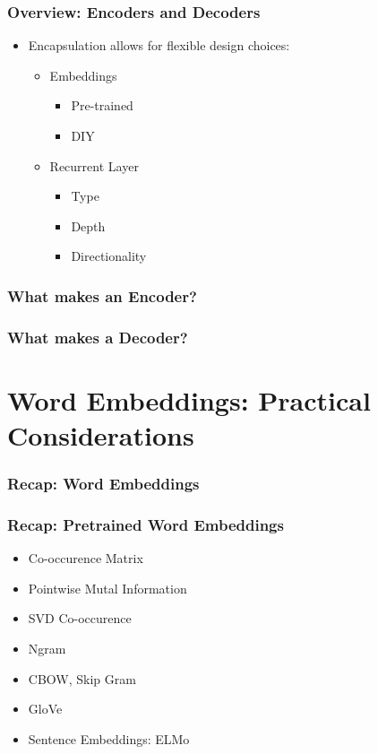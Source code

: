 \documentclass{beamer}
\begin{document}
\begin{frame}
\frametitle{Overview: Encoders and Decoders}
\begin{itemize}
  \item Encapsulation allows for flexible design choices:
  \begin{itemize}
    \item Embeddings
    \begin{itemize}
      \item Pre-trained
      \item DIY
    \end{itemize}
    \item Recurrent Layer
    \begin{itemize}
      \item Type
      \item Depth
      \item Directionality
    \end{itemize}
  \end{itemize}
\end{itemize}
\end{frame}

\begin{frame}
\frametitle{What makes an Encoder?}

\end{frame}

\begin{frame}
\frametitle{What makes a Decoder?}

\end{frame}


\section{Word Embeddings: Practical Considerations}

\begin{frame}
\frametitle{Recap: Word Embeddings}

\end{frame}


\begin{frame}
\frametitle{Recap: Pretrained Word Embeddings}
\begin{itemize}
  \item Co-occurence Matrix
  \item Pointwise Mutal Information
  \item SVD Co-occurence
  \item Ngram
  \item CBOW, Skip Gram
  \item GloVe
  \item Sentence Embeddings: ELMo
\end{itemize}

\end{frame}
\end{document}
